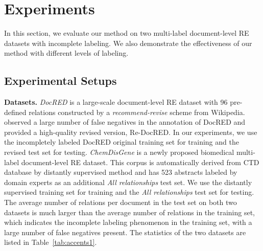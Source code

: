 \documentclass[11pt]{article}
\begin{document}
\section{Experiments}
In this section, we evaluate our method on two multi-label document-level RE datasets with incomplete labeling. We also demonstrate the effectiveness of our method with different levels of labeling.

\subsection{Experimental Setups}

\textbf{Datasets.} \enspace \emph{DocRED} \citep{yao-etal-2019-docred} is a large-scale document-level RE dataset with 96 pre-defined relations constructed by a \emph{recommend-revise} scheme from Wikipedia. \citep{tan2022revisiting} observed a large number of false negatives in the annotation of DocRED and provided a high-quality revised version, Re-DocRED. In our experiments, we use the incompletely labeled DocRED original training set for training and the revised test set for testing. \enspace \emph{ChemDisGene} \citep{zhang-etal-2022-distant} is a newly proposed biomedical multi-label document-level RE dataset. This corpus is automatically derived from CTD database \citep{davis2021comparative} by distantly supervised method and has 523 abstracts labeled by domain experts as an additional \emph{All relationships} test set. We use the distantly supervised training set for training and the \emph{All relationships} test set for testing. \enspace The average number of relations per document in the test set on both two datasets is much larger than the average number of relations in the training set, which indicates the incomplete labeling phenomenon in the training set, with a large number of false negatives present. The statistics of the two datasets are listed in Table~\ref{tab:accents1}.
\end{document}
